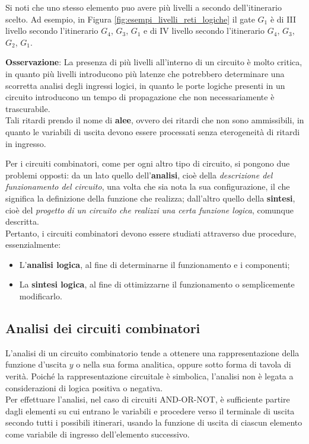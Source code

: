 \documentclass[a4paper]{extarticle}
\begin{document}
\noindent
Si noti che uno stesso elemento puo avere più livelli a secondo dell’itinerario scelto. Ad esempio, in Figura \ref{fig:esempi_livelli_reti_logiche} il gate $G_1$ è di III livello secondo l’itinerario $G_4$, $G_3$, $G_1$ e di IV livello secondo l’itinerario $G_4$, $G_3$, $G_2$, $G_1$.

\vspace{1em}
\noindent
\textbf{Osservazione}: La presenza di più livelli all'interno di un circuito è molto critica, in quanto più livelli introducono più latenze che potrebbero determinare una scorretta analisi degli ingressi logici, in quanto le porte logiche presenti in un circuito introducono un tempo di propagazione che non necessariamente è trascurabile.\\
Tali ritardi prendo il nome di \textbf{alee}, ovvero dei ritardi che non sono ammissibili, in quanto le variabili di uscita devono essere processati senza eterogeneità di ritardi in ingresso.

\vspace{1em}
\noindent
Per i circuiti combinatori, come per ogni altro tipo di circuito, si pongono due problemi opposti: da un lato quello dell’\textbf{analisi}, cioè della \emph{descrizione del funzionamento del circuito}, una volta che sia nota la sua configurazione, il che significa la definizione della funzione che realizza; dall’altro quello della \textbf{sintesi}, cioè del \emph{progetto di un circuito che realizzi una certa funzione logica}, comunque descritta.\\
Pertanto, i circuiti combinatori devono essere studiati attraverso due procedure, essenzialmente:
\begin{itemize}
    \item L'\textbf{analisi logica}, al fine di determinarne il funzionamento e i componenti;
    \item La \textbf{sintesi logica}, al fine di ottimizzarne il funzionamento o semplicemente modificarlo.
\end{itemize}

\subsection{Analisi dei circuiti combinatori}
L’analisi di un circuito combinatorio tende a ottenere una rappresentazione della funzione d’uscita \(y\) o nella sua forma analitica, oppure sotto forma di tavola di verità. Poiché la rappresentazione circuitale è simbolica, l’analisi non è legata a considerazioni di logica positiva o negativa.\\
Per effettuare l’analisi, nel caso di circuiti AND-OR-NOT, è sufficiente partire dagli elementi su cui entrano le variabili e procedere verso il terminale di uscita secondo tutti i possibili itinerari, usando la funzione di uscita di ciascun elemento come variabile di ingresso dell’elemento successivo.
\end{document}
